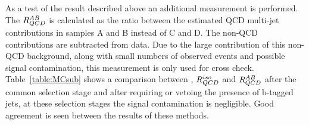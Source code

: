 

As a test of the result described above an additional measurement is performed.
The $R_{QCD}^{AB}$ is calculated as the ratio between the estimated QCD multi-jet contributions in samples A 
and B instead of C and D. The non-QCD contributions are subtracted from data. Due to the large contribution of this non-QCD background, 
along with small numbers of observed events and possible signal contamination, this measurement is only used for cross check. Table~\ref{table:MCsub} shows 
a comparison between \rqcd, $R_{QCD}^{iso}$ and $R_{QCD}^{AB}$ after the common selection stage and after requiring
or vetoing the presence of b-tagged jets,  at these selection stages the signal contamination is negligible. 
Good agreement is seen between the results of these methods. 

